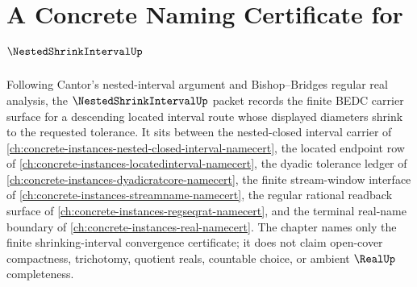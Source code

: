 \chapter{A Concrete Naming Certificate for $\NestedShrinkIntervalUp$}
\label{ch:concrete-instances-nested-shrink-interval-namecert}

Following Cantor's nested-interval argument and Bishop--Bridges regular real analysis, the $\NestedShrinkIntervalUp$ packet records the finite BEDC carrier surface for a descending located interval route whose displayed diameters shrink to the requested tolerance. It sits between the nested-closed interval carrier of \autoref{ch:concrete-instances-nested-closed-interval-namecert}, the located endpoint row of \autoref{ch:concrete-instances-locatedinterval-namecert}, the dyadic tolerance ledger of \autoref{ch:concrete-instances-dyadicratcore-namecert}, the finite stream-window interface of \autoref{ch:concrete-instances-streamname-namecert}, the regular rational readback surface of \autoref{ch:concrete-instances-regseqrat-namecert}, and the terminal real-name boundary of \autoref{ch:concrete-instances-real-namecert}. The chapter names only the finite shrinking-interval convergence certificate; it does not claim open-cover compactness, trichotomy, quotient reals, countable choice, or ambient $\RealUp$ completeness.

